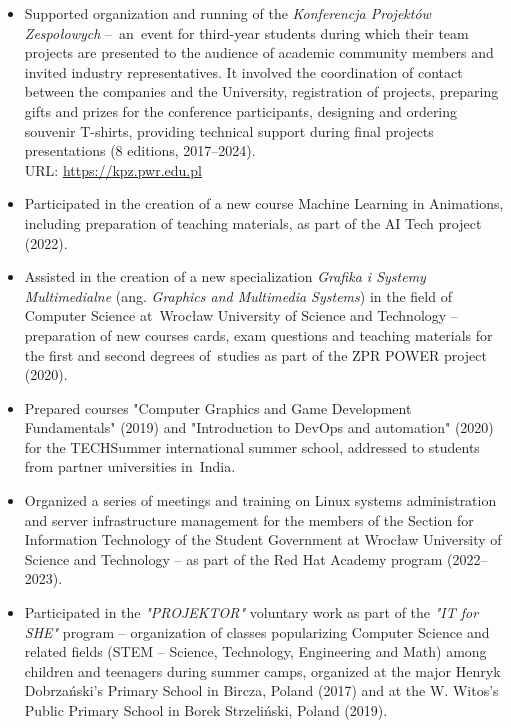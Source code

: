 \begin{itemize}
    \item Supported organization and running of the \textit{Konferencja Projektów Zespołowych} –~an~event for third-year students during which their team projects are presented to the audience of academic community members and invited industry representatives. It involved the coordination of contact between the companies and the University, registration of projects, preparing gifts and prizes for the conference participants, designing and ordering souvenir T-shirts, providing technical support during final projects presentations (8 editions, 2017–2024).\\
        URL: \url{https://kpz.pwr.edu.pl}

    \item Participated in the creation of a new course Machine Learning in Animations, including preparation of teaching materials, as part of the AI Tech project (2022).

    \item Assisted in the creation of a new specialization \textit{Grafika i Systemy Multimedialne} (ang. \textit{Graphics and Multimedia Systems}) in the field of Computer Science at~Wrocław University of Science and Technology – preparation of new courses cards, exam questions and teaching materials for the first and second degrees of~studies as part of the ZPR POWER project (2020).

    \item Prepared courses "Computer Graphics and Game Development Fundamentals" (2019) and "Introduction to DevOps and automation" (2020) for the TECHSummer international summer school, addressed to students from partner universities in~India.

    \item Organized a series of meetings and training on Linux systems administration and server infrastructure management for the members of the Section for Information Technology of the Student Government at Wrocław University of Science and Technology – as part of the Red Hat Academy program (2022–2023).

    \item Participated in the \textit{"PROJEKTOR"} voluntary work as part of the \textit{"IT for SHE"} program – organization of classes popularizing Computer Science and related fields (STEM – Science, Technology, Engineering and Math) among children and teenagers during summer camps, organized at the major Henryk Dobrzański's Primary School in Bircza, Poland (2017) and at the W. Witos's Public Primary School in Borek Strzeliński, Poland (2019).


\end{itemize}
